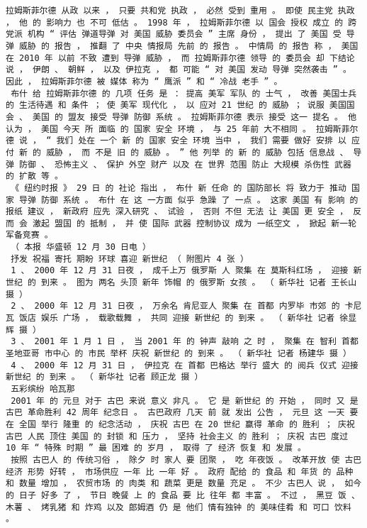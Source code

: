 \documentclass{article}
\begin{document}
\begin{Verbatim}[commandchars=\\\{\}]
 拉姆斯菲尔德 从政 以来 ， 只要 共和党 执政 ， 必然 受到 重用 。 即使 民主党 执政 ， 他 的 影响力 也 不可 低估 。 1998 年 ， 拉姆斯菲尔德 以 国会 授权 成立 的 跨 党派 机构 “ 评估 弹道导弹 对 美国 威胁 委员会 ” 主席 身份 ， 提出 了 美国 受 导弹 威胁 的 报告 ， 推翻 了 中央 情报局 先前 的 报告 。 中情局 的 报告 称 ， 美国 在 2010 年 以前 不致 遭到 导弹 威胁 ， 而 拉姆斯菲尔德 领导 的 委员会 却 下结论 说 ， 伊朗 、 朝鲜 ， 以及 伊拉克 ， 都 可能 “ 对 美国 发动 导弹 突然袭击 ” 。 因此 ， 拉姆斯菲尔德 被 媒体 称为 “ 鹰派 ” 和 “ 冷战 老手 ” 。 
 布什 给 拉姆斯菲尔德 的 几项 任务 是 ： 提高 美军 军队 的 士气 ， 改善 美国士兵 的 生活待遇 和 条件 ； 使 美军 现代化 ， 以 应对 21 世纪 的 威胁 ； 说服 美国国会 、 美国 的 盟友 接受 导弹 防御 系统 。 拉姆斯菲尔德 表示 接受 这一 提名 。 他 认为 ， 美国 今天 所 面临 的 国家 安全 环境 ， 与 25 年前 大不相同 。 拉姆斯菲尔德 说 ， “ 我们 处在 一个 新 的 国家 安全 环境 当中 ， 我们 需要 做好 安排 以 应付 新 的 威胁 ， 而 不是 旧 的 威胁 。 ” 他 列举 的 新 的 威胁 包括 信息战 、 导弹 防御 、 恐怖主义 、 保护 外空 财产 以及 在 世界 范围 防止 大规模 杀伤性 武器 的 扩散 等 。 
 《 纽约时报 》 29 日 的 社论 指出 ， 布什 新 任命 的 国防部长 将 致力于 推动 国家 导弹 防御 系统 。 布什 在 这 一方面 似乎 急躁 了 一点 。 这家 美国 有 影响 的 报纸 建议 ， 新政府 应先 深入研究 、 试验 ， 否则 不但 无法 让 美国 更 安全 ， 反而 会 激起 盟国 的 抵制 ， 并 使 国际 武器 控制协议 成为 一纸空文 ， 掀起 新一轮 军备竞赛 。 
 （ 本报 华盛顿 12 月 30 日电 ） 
 抒发 祝福 寄托 期盼 环球 喜迎 新世纪 （ 附图片 4 张 ） 
 1 、 2000 年 12 月 31 日夜 ， 成千上万 俄罗斯 人 聚集 在 莫斯科红场 ， 迎接 新世纪 的 到来 。 图为 两名 头顶 新年 饰帽 的 俄罗斯 女孩 。 （ 新华社 记者 王长山 摄 ） 
 2 、 2000 年 12 月 31 日夜 ， 万余名 肯尼亚人 聚集 在 首都 内罗毕 市郊 的 卡尼瓦 饭店 娱乐 广场 ， 载歌载舞 ， 共同 迎接 新世纪 的 到来 。 （ 新华社 记者 徐显辉 摄 ） 
 3 、 2001 年 1 月 1 日 ， 当 2001 年 的 钟声 敲响 之 时 ， 聚集 在 智利 首都 圣地亚哥 市中心 的 市民 举杯 庆祝 新世纪 的 到来 。 （ 新华社 记者 杨建华 摄 ） 
 4 、 2000 年 12 月 31 日 ， 伊拉克 在 首都 巴格达 举行 盛大 的 阅兵 仪式 迎接 新世纪 的 到来 。 （ 新华社 记者 顾正龙 摄 ） 
 五彩缤纷 哈瓦那 
 2001 年 的 元旦 对于 古巴 来说 意义 非凡 。 它 是 新世纪 的 开始 ， 同时 又 是 古巴 革命胜利 42 周年 纪念日 。 古巴政府 几天 前 就 发出 公告 ， 元旦 这 一天 要 在 全国 举行 隆重 的 纪念活动 ， 庆祝 古巴 在 20 世纪 赢得 革命 的 胜利 ； 庆祝 古巴 人民 顶住 美国 的 封锁 和 压力 ， 坚持 社会主义 的 胜利 ； 庆祝 古巴 度过 10 年 “ 特殊 时期 ” 最 困难 的 岁月 ， 取得 了 经济 恢复 和 发展 。 
 按照 古巴人 的 传统习俗 ， 除夕 时 家人 要 团聚 ， 吃 年夜饭 。 改革开放 使 古巴 经济 形势 好转 ， 市场供应 一年 比 一年 好 。 政府 配给 的 食品 和 年货 的 品种 和 数量 增加 ， 农贸市场 的 肉类 和 蔬菜 更是 数量 充足 。 不少 古巴人 说 ， 如今 的 日子 好多 了 ， 节日 晚餐 上 的 食品 要 比 往年 都 丰富 。 不过 ， 黑豆 饭 、 木薯 、 烤乳猪 和 炸鸡 以及 郎姆酒 仍 是 他们 情有独钟 的 美味佳肴 和 可口 饮料 。 

\end{Verbatim}
\end{document}
